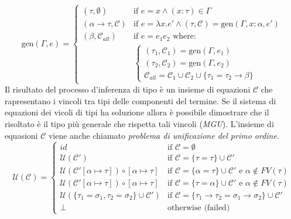 \begin{equation}
    \text{gen}(\Gamma, e) = 
    \begin{cases} 
        (\tau, \emptyset) & \text{if } e = x \land (x : \tau) \in \Gamma \\
        (\alpha \to \tau, \mathcal{C}) & \text{if } e = \lambda x. e' \land (\tau, \mathcal{C}) = \text{gen}(\Gamma, x : \alpha, e') \\
        (\beta, \mathcal{C}_{all}) & \text{if } e = e_1 e_2 \text{ where:} \\ & 
        \begin{cases} 
            (\tau_1, \mathcal{C}_1) = \text{gen}(\Gamma, e_1) \\
            (\tau_2, \mathcal{C}_2) = \text{gen}(\Gamma, e_2) \\
            \mathcal{C}_{all} = \mathcal{C}_1 \cup \mathcal{C}_2 \cup \{\tau_1 = \tau_2 \to \beta\}
        \end{cases}
    \end{cases}
    \label{eq:constraint_generation}
\end{equation}
Il risultato del processo d'inferenza di tipo è un insieme di equazioni $\mathcal{C}$ che rapresentano i vincoli tra tipi delle componenti del termine.
Se il sistema di equazioni dei vicoli di tipi ha soluzione allora è possibile dimostrare che il risoltato è il tipo più generale che rispetta tali vincoli 
(\emph{MGU}). L'insieme di equasioni $\mathcal{C}$ viene anche chiamato \emph{problema di unificazione del primo ordine}.
\begin{equation}
    \mathcal{U}(\mathcal{C}) = 
    \begin{cases} 
        id & \text{if } \mathcal{C} = \emptyset \\
        \mathcal{U}(\mathcal{C}') & \text{if } \mathcal{C} = \{\tau = \tau\} \cup \mathcal{C}' \\
        \mathcal{U}(\mathcal{C}'[\alpha \mapsto \tau]) \circ [\alpha \mapsto \tau] & \text{if } \mathcal{C} = \{\alpha = \tau\} \cup \mathcal{C}' \text{ e } \alpha \notin FV(\tau) \\
        \mathcal{U}(\mathcal{C}'[\alpha \mapsto \tau]) \circ [\alpha \mapsto \tau] & \text{if } \mathcal{C} = \{\tau = \alpha\} \cup \mathcal{C}' \text{ e } \alpha \notin FV(\tau) \\
        \mathcal{U}(\{\tau_1 = \sigma_1, \tau_2 = \sigma_2\} \cup \mathcal{C}') & \text{if }    \mathcal{C} = \{\tau_1 \to \tau_2 = \sigma_1 \to \sigma_2\} \cup \mathcal{C}' \\
        \perp & \text{otherwise (failed)}
    \end{cases}
    \label{eq:unification_algorithm}
\end{equation}
